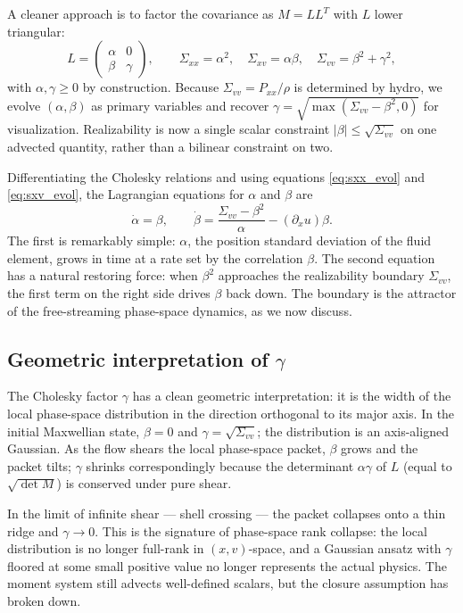 \documentclass[11pt,letterpaper]{article}
\begin{document}
A cleaner approach is to factor the covariance as $M = L L^T$ with $L$ lower triangular:
\begin{equation}
L = \begin{pmatrix} \alpha & 0 \\ \beta & \gamma \end{pmatrix},
\qquad
\Sigma_{xx} = \alpha^2, \quad \Sigma_{xv} = \alpha \beta, \quad \Sigma_{vv} = \beta^2 + \gamma^2,
\end{equation}
with $\alpha, \gamma \geq 0$ by construction. Because $\Sigma_{vv} = P_{xx}/\rho$ is determined by hydro, we evolve $(\alpha, \beta)$ as primary variables and recover $\gamma = \sqrt{\max(\Sigma_{vv} - \beta^2, 0)}$ for visualization. Realizability is now a single scalar constraint $|\beta| \leq \sqrt{\Sigma_{vv}}$ on one advected quantity, rather than a bilinear constraint on two.

Differentiating the Cholesky relations and using equations \eqref{eq:sxx_evol} and \eqref{eq:sxv_evol}, the Lagrangian equations for $\alpha$ and $\beta$ are
\begin{equation}
\dot \alpha = \beta, \qquad \dot \beta = \frac{\Sigma_{vv} - \beta^2}{\alpha} - (\partial_x u) \beta.
\label{eq:cholesky_evol}
\end{equation}
The first is remarkably simple: $\alpha$, the position standard deviation of the fluid element, grows in time at a rate set by the correlation $\beta$. The second equation has a natural restoring force: when $\beta^2$ approaches the realizability boundary $\Sigma_{vv}$, the first term on the right side drives $\beta$ back down. The boundary is the attractor of the free-streaming phase-space dynamics, as we now discuss.

\subsection{Geometric interpretation of $\gamma$}

The Cholesky factor $\gamma$ has a clean geometric interpretation: it is the width of the local phase-space distribution in the direction orthogonal to its major axis. In the initial Maxwellian state, $\beta = 0$ and $\gamma = \sqrt{\Sigma_{vv}}$; the distribution is an axis-aligned Gaussian. As the flow shears the local phase-space packet, $\beta$ grows and the packet tilts; $\gamma$ shrinks correspondingly because the determinant $\alpha \gamma$ of $L$ (equal to $\sqrt{\det M}$) is conserved under pure shear.

In the limit of infinite shear --- shell crossing --- the packet collapses onto a thin ridge and $\gamma \to 0$. This is the signature of phase-space rank collapse: the local distribution is no longer full-rank in $(x, v)$-space, and a Gaussian ansatz with $\gamma$ floored at some small positive value no longer represents the actual physics. The moment system still advects well-defined scalars, but the closure assumption has broken down.
\end{document}
